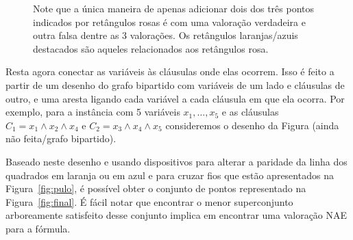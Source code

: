 \begin{figure}
    \caption{Note que a única maneira de apenas adicionar dois dos três pontos indicados por retângulos rosas é com uma valoração verdadeira e outra falsa dentre as 3 valorações. Os retângulos laranjas/azuis destacados são aqueles relacionados aos retângulos rosa.}
\label{fig:clausula}
\end{figure}

Resta agora conectar as variáveis às cláusulas onde elas ocorrem. Isso é feito a partir de um desenho do grafo bipartido com variáveis de um lado e cláusulas de outro, e uma aresta ligando cada variável a cada cláusula em que ela ocorra. Por exemplo, para a instância com 5 variáveis $x_1,\ldots,x_5$ e as cláusulas $C_1 = x_1 \land x_2 \land x_4$ e $C_2 = x_3 \land x_4 \land x_5$ consideremos o desenho da Figura (ainda não feita/grafo bipartido).

Baseado neste desenho e usando dispositivos para alterar a paridade da linha dos quadrados em laranja ou em azul e para cruzar fios que estão apresentados na Figura~\ref{fig:pulo}, é possível obter o conjunto de pontos representado na Figura~\ref{fig:final}. É fácil notar que encontrar o menor superconjunto arboreamente satisfeito desse conjunto implica em encontrar uma valoração NAE para a fórmula. 

